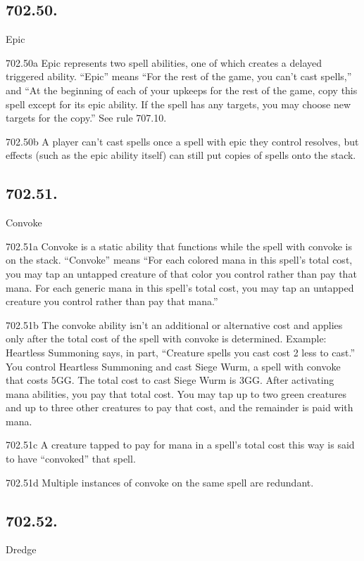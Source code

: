 \subsection*{702.50.}
Epic

702.50a Epic represents two spell abilities, one of which creates a delayed triggered ability. “Epic” means “For the rest of the game, you can’t cast spells,” and “At the beginning of each of your upkeeps for the rest of the game, copy this spell except for its epic ability. If the spell has any targets, you may choose new targets for the copy.” See rule 707.10.

702.50b A player can’t cast spells once a spell with epic they control resolves, but effects (such as the epic ability itself) can still put copies of spells onto the stack.

\subsection*{702.51.}
Convoke

702.51a Convoke is a static ability that functions while the spell with convoke is on the stack. “Convoke” means “For each colored mana in this spell’s total cost, you may tap an untapped creature of that color you control rather than pay that mana. For each generic mana in this spell’s total cost, you may tap an untapped creature you control rather than pay that mana.”

702.51b The convoke ability isn’t an additional or alternative cost and applies only after the total cost of the spell with convoke is determined.
Example: Heartless Summoning says, in part, “Creature spells you cast cost {2} less to cast.” You control Heartless Summoning and cast Siege Wurm, a spell with convoke that costs {5}{G}{G}. The total cost to cast Siege Wurm is {3}{G}{G}. After activating mana abilities, you pay that total cost. You may tap up to two green creatures and up to three other creatures to pay that cost, and the remainder is paid with mana.

702.51c A creature tapped to pay for mana in a spell’s total cost this way is said to have “convoked” that spell.

702.51d Multiple instances of convoke on the same spell are redundant.

\subsection*{702.52.}
Dredge

